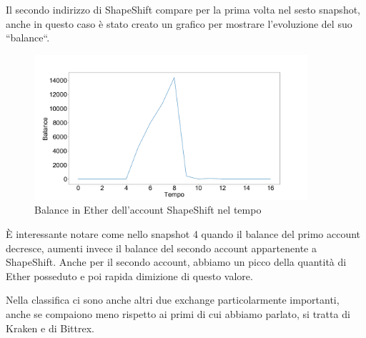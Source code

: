 \documentclass[12pt]{report}
\begin{document}
\begin{itemize}
    Il secondo indirizzo di ShapeShift compare per la prima volta nel sesto snapshot, anche in questo caso è stato creato un grafico per mostrare l'evoluzione del suo ``balance``.
    
    \begin{figure}[H]
    \centering\includegraphics[width=0.9\textwidth]{Shapeshift_2.png}
    \caption{Balance in Ether dell'account ShapeShift nel tempo}
    \end{figure}
    
    È interessante notare come nello snapshot 4 quando il balance del primo account decresce, aumenti invece il balance del secondo account appartenente a ShapeShift. Anche per il secondo account, abbiamo un picco della quantità di Ether posseduto e poi rapida dimizione di questo valore.
    
    Nella classifica ci sono anche altri due exchange particolarmente importanti, anche se compaiono meno rispetto ai primi di cui abbiamo parlato, si tratta di Kraken e di Bittrex.
    

\end{itemize}
\end{document}
